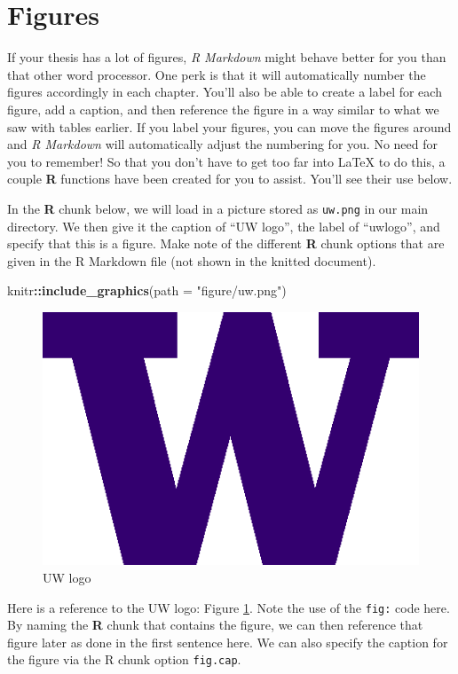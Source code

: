 \documentclass[ms]{uncgdissertationexp}
\newenvironment{Shaded}{\begin{snugshade}}{\end{snugshade}}
\newcommand{\KeywordTok}[1]{\textcolor[rgb]{0.13,0.29,0.53}{\textbf{#1}}}
\newcommand{\DataTypeTok}[1]{\textcolor[rgb]{0.13,0.29,0.53}{#1}}
\newcommand{\StringTok}[1]{\textcolor[rgb]{0.31,0.60,0.02}{#1}}
\newcommand{\OperatorTok}[1]{\textcolor[rgb]{0.81,0.36,0.00}{\textbf{#1}}}
\newcommand{\NormalTok}[1]{#1}
\theoremstyle{plain}
\theoremstyle{definition}
\theoremstyle{remark}
\begin{document}
  \clearpage
  
  \section{Figures}\label{figures}
  
  If your thesis has a lot of figures, \emph{R Markdown} might behave
  better for you than that other word processor. One perk is that it will
  automatically number the figures accordingly in each chapter. You'll
  also be able to create a label for each figure, add a caption, and then
  reference the figure in a way similar to what we saw with tables
  earlier. If you label your figures, you can move the figures around and
  \emph{R Markdown} will automatically adjust the numbering for you. No
  need for you to remember! So that you don't have to get too far into
  LaTeX to do this, a couple \textbf{R} functions have been created for
  you to assist. You'll see their use below.
  
  In the \textbf{R} chunk below, we will load in a picture stored as
  \texttt{uw.png} in our main directory. We then give it the caption of
  ``UW logo'', the label of ``uwlogo'', and specify that this is a figure.
  Make note of the different \textbf{R} chunk options that are given in
  the R Markdown file (not shown in the knitted document).
  \begin{Shaded}
  \begin{Highlighting}[]
  \NormalTok{knitr}\OperatorTok{::}\KeywordTok{include_graphics}\NormalTok{(}\DataTypeTok{path =} \StringTok{"figure/uw.png"}\NormalTok{)}
  \end{Highlighting}
  \end{Shaded}
  \begin{figure}
  \includegraphics[width=6.25in]{figure/uw} \caption{UW logo}\label{fig:uwlogo}
  \end{figure}
  Here is a reference to the UW logo: Figure \ref{fig:uwlogo}. Note the
  use of the \texttt{fig:} code here. By naming the \textbf{R} chunk that
  contains the figure, we can then reference that figure later as done in
  the first sentence here. We can also specify the caption for the figure
  via the R chunk option \texttt{fig.cap}.
  
\end{document}

